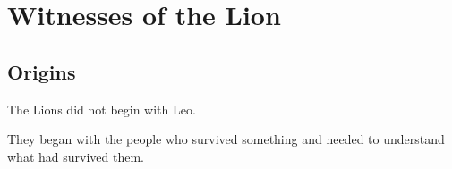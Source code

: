 
\section{Witnesses of the Lion}

\subsection{Origins}

The Lions did not begin with Leo.

They began with the people who survived something and needed to understand what had survived them.

